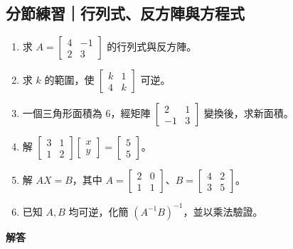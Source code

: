 \documentclass[11pt,a4paper]{article}
\providecommand{\tightlist}{%
  \setlength{\itemsep}{0pt}\setlength{\parskip}{0pt}}
\begin{document}
\begin{HandoutSelfCheck}

\subsection{分節練習｜行列式、反方陣與方程式}\label{ux5206ux7bc0ux7df4ux7fd2ux884cux5217ux5f0fux53cdux65b9ux9663ux8207ux65b9ux7a0bux5f0f}

\begin{enumerate}
\def\labelenumi{\arabic{enumi}.}
\tightlist
\item
  求 \(A=\begin{bmatrix}4&-1\\2&3\end{bmatrix}\) 的行列式與反方陣。
\item
  求 \(k\) 的範圍，使 \(\begin{bmatrix}k&1\\4&k\end{bmatrix}\) 可逆。
\item
  一個三角形面積為 \(6\)，經矩陣 \(\begin{bmatrix}2&1\\-1&3\end{bmatrix}\) 變換後，求新面積。
\item
  解 \(\begin{bmatrix}3&1\\1&2\end{bmatrix}\begin{bmatrix}x\\y\end{bmatrix}=\begin{bmatrix}5\\5\end{bmatrix}\)。
\item
  解 \(AX=B\)，其中 \(A=\begin{bmatrix}2&0\\1&1\end{bmatrix}\)、\(B=\begin{bmatrix}4&2\\3&5\end{bmatrix}\)。
\item
  已知 \(A,B\) 均可逆，化簡 \((A^{-1}B)^{-1}\)，並以乘法驗證。
\end{enumerate}

\textbf{解答}


\end{HandoutSelfCheck}
\end{document}
